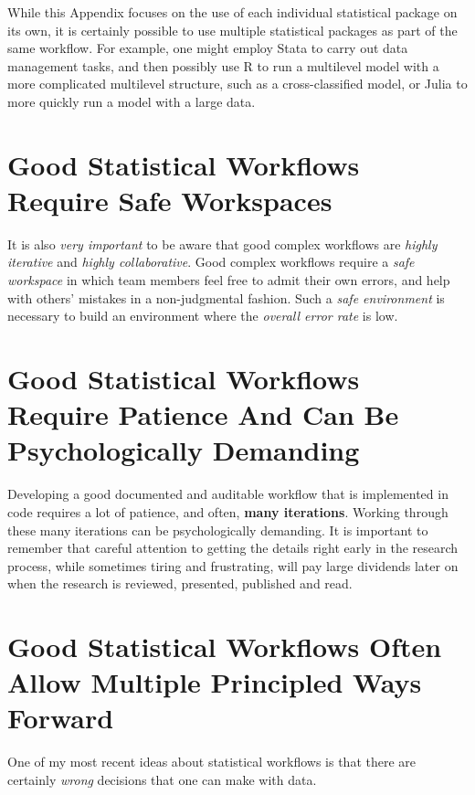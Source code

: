 \documentclass[
  letterpaper,
  DIV=11,
  numbers=noendperiod]{scrreprt}
\begin{document}
While this Appendix focuses on the use of each individual statistical
package on its own, it is certainly possible to use multiple statistical
packages as part of the same workflow. For example, one might employ
Stata to carry out data management tasks, and then possibly use R to run
a multilevel model with a more complicated multilevel structure, such as
a cross-classified model, or Julia to more quickly run a model with a
large data.

\section{Good Statistical Workflows Require Safe
Workspaces}\label{good-statistical-workflows-require-safe-workspaces}

It is also \emph{very important} to be aware that good complex workflows
are \emph{highly iterative} and \emph{highly collaborative}. Good
complex workflows require a \emph{safe workspace} in which team members
feel free to admit their own errors, and help with others' mistakes in a
non-judgmental fashion. Such a \emph{safe environment} is necessary to
build an environment where the \emph{overall error rate} is low.

\section{Good Statistical Workflows Require Patience And Can Be
Psychologically
Demanding}\label{good-statistical-workflows-require-patience-and-can-be-psychologically-demanding}

Developing a good documented and auditable workflow that is implemented
in code requires a lot of patience, and often, \textbf{many iterations}.
Working through these many iterations can be psychologically demanding.
It is important to remember that careful attention to getting the
details right early in the research process, while sometimes tiring and
frustrating, will pay large dividends later on when the research is
reviewed, presented, published and read.

\section{Good Statistical Workflows Often Allow Multiple Principled Ways
Forward}\label{good-statistical-workflows-often-allow-multiple-principled-ways-forward}

One of my most recent ideas about statistical workflows is that there
are certainly \emph{wrong} decisions that one can make with data.
\end{document}
